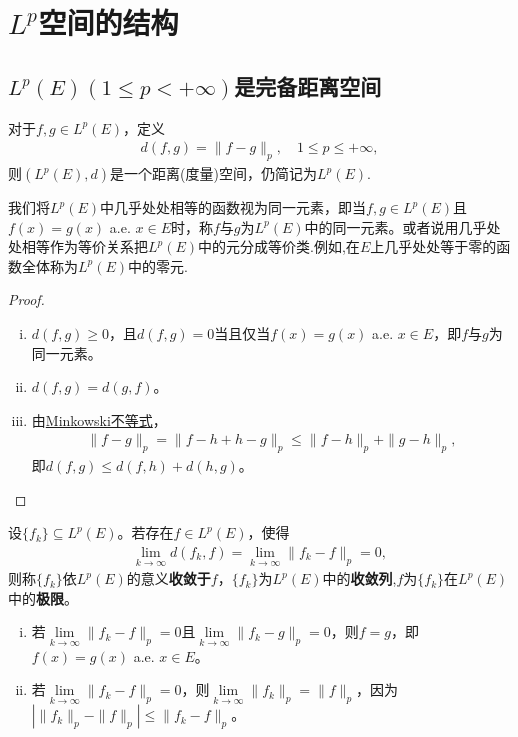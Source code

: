\documentclass[../../main.tex]{subfiles}%
\begin{document}
\section{$L^p$空间的结构}

\subsection{$L^p(E)(1\leqslant p<+\infty)$是完备距离空间}

\begin{theorem}
对于$f,g\in L^p(E)$，定义
\begin{align*}
d(f,g)=\|f-g\|_p,\quad 1\leqslant p\leqslant+\infty,
\end{align*}
则$(L^p(E),d)$是一个距离(度量)空间，仍简记为$L^p(E)$.
\end{theorem}
\begin{remark}
我们将$L^p(E)$中几乎处处相等的函数视为同一元素，即当$f,g\in L^p(E)$且$f(x)=g(x)$ a.e. $x\in E$时，称$f$与$g$为$L^p(E)$中的同一元素。或者说用几乎处处相等作为等价关系把$L^p(E)$中的元分成等价类.例如,在$E$上几乎处处等于零的函数全体称为$L^p(E)$中的零元.
\end{remark}
\begin{proof}
\begin{enumerate}[(i)]
\item $d(f,g)\geqslant0$，且$d(f,g)=0$当且仅当$f(x)=g(x)$ a.e. $x\in E$，即$f$与$g$为同一元素。

\item $d(f,g)=d(g,f)$。

\item 由\hyperref[theorem:实变函数--Minkowski不等式]{Minkowski不等式}，
\begin{align*}
\|f-g\|_p=\|f-h+h-g\|_p
\leqslant\|f-h\|_p+\|g-h\|_p,
\end{align*}
即$d(f,g)\leqslant d(f,h)+d(h,g)$。
\end{enumerate}
\end{proof}

\begin{definition}
设$\{f_k\}\subseteq L^p(E)$。若存在$f\in L^p(E)$，使得
\begin{align*}
\lim\limits_{k\to\infty}d(f_k,f)=\lim\limits_{k\to\infty}\|f_k-f\|_p=0,
\end{align*}
则称$\{f_k\}$依$L^p(E)$的意义\textbf{收敛于}$f$，$\{f_k\}$为$L^p(E)$中的\textbf{收敛列},$f$为$\{f_k\}$在$L^p(E)$中的\textbf{极限}。
\end{definition}

\begin{proposition}
\begin{enumerate}[(i)]
\item 若$\lim\limits_{k\to\infty}\|f_k-f\|_p=0$且$\lim\limits_{k\to\infty}\|f_k-g\|_p=0$，则$f=g$，即$f(x)=g(x)$ a.e. $x\in E$。
\item 若$\lim\limits_{k\to\infty}\|f_k-f\|_p=0$，则$\lim\limits_{k\to\infty}\|f_k\|_p=\|f\|_p$，因为$|\|f_k\|_p-\|f\|_p|\leqslant\|f_k-f\|_p$。
\end{enumerate}
\end{proposition}
\end{document}
